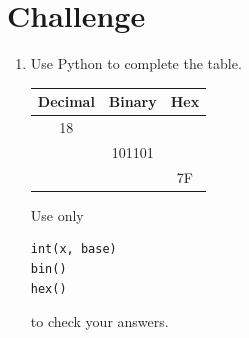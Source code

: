 \documentclass{article}
\begin{document}
\section{Challenge}

\begin{enumerate}

\item Use Python to complete the table.

\begin{center}
\begin{tabular}{c|c|c}
Decimal & Binary & Hex \\ \hline
18 & & \\
& 101101 & \\
& & 7F
\end{tabular}
\end{center}

Use only

\begin{verbatim}
int(x, base)
bin()
hex()
\end{verbatim}

to check your answers.

\end{enumerate}
\end{document}
